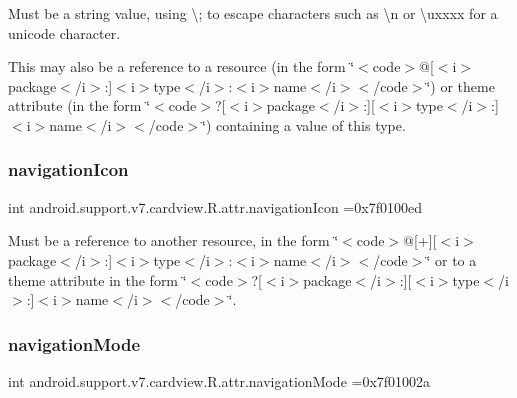 Must be a string value, using \textquotesingle{}\textbackslash{};\textquotesingle{} to escape characters such as \textquotesingle{}\textbackslash{}n\textquotesingle{} or \textquotesingle{}\textbackslash{}uxxxx\textquotesingle{} for a unicode character. 

This may also be a reference to a resource (in the form \char`\"{}$<$code$>$@\mbox{[}$<$i$>$package$<$/i$>$\+:\mbox{]}$<$i$>$type$<$/i$>$\+:$<$i$>$name$<$/i$>$$<$/code$>$\char`\"{}) or theme attribute (in the form \char`\"{}$<$code$>$?\mbox{[}$<$i$>$package$<$/i$>$\+:\mbox{]}\mbox{[}$<$i$>$type$<$/i$>$\+:\mbox{]}$<$i$>$name$<$/i$>$$<$/code$>$\char`\"{}) containing a value of this type. \mbox{\label{classandroid_1_1support_1_1v7_1_1cardview_1_1R_1_1attr_af6d320e73203dd5ad5b891676fda2728}} 
\subsubsection{\texorpdfstring{navigation\+Icon}{navigationIcon}}
{\footnotesize\ttfamily int android.\+support.\+v7.\+cardview.\+R.\+attr.\+navigation\+Icon =0x7f0100ed\hspace{0.3cm}{\ttfamily [static]}}

Must be a reference to another resource, in the form \char`\"{}$<$code$>$@\mbox{[}+\mbox{]}\mbox{[}$<$i$>$package$<$/i$>$\+:\mbox{]}$<$i$>$type$<$/i$>$\+:$<$i$>$name$<$/i$>$$<$/code$>$\char`\"{} or to a theme attribute in the form \char`\"{}$<$code$>$?\mbox{[}$<$i$>$package$<$/i$>$\+:\mbox{]}\mbox{[}$<$i$>$type$<$/i$>$\+:\mbox{]}$<$i$>$name$<$/i$>$$<$/code$>$\char`\"{}. \mbox{\label{classandroid_1_1support_1_1v7_1_1cardview_1_1R_1_1attr_a2e22dbe20931048f60b82a6a397e1626}} 
\subsubsection{\texorpdfstring{navigation\+Mode}{navigationMode}}
{\footnotesize\ttfamily int android.\+support.\+v7.\+cardview.\+R.\+attr.\+navigation\+Mode =0x7f01002a\hspace{0.3cm}{\ttfamily [static]}}

